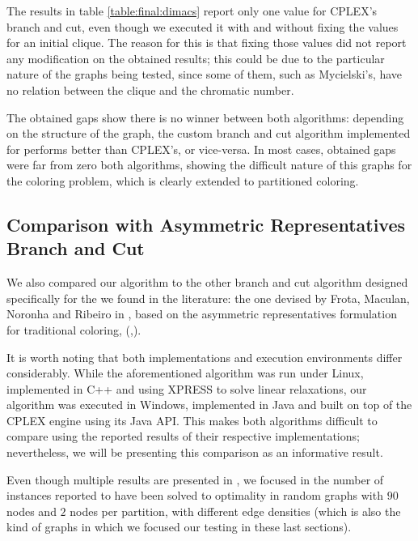 The results in table \ref{table:final:dimacs} report only one value for \textsc{CPLEX}'s branch and cut, even though we executed it with and without fixing the values for an initial clique. The reason for this is that fixing those values did not report any modification on the obtained results; this could be due to the particular nature of the graphs being tested, since some of them, such as Mycielski's, have no relation between the clique and the chromatic number.

The obtained gaps show there is no winner between both algorithms: depending on the structure of the graph, the custom branch and cut algorithm implemented for \PCP{} performs better than \textsc{CPLEX}'s, or vice-versa. In most cases, obtained gaps were far from zero both algorithms, showing the difficult nature of this graphs for the coloring problem, which is clearly extended to partitioned coloring.
 
\subsection{Comparison with Asymmetric Representatives Branch and Cut}

We also compared our algorithm to the other branch and cut algorithm designed specifically for the \PCP{} we found in the literature: the one devised by Frota, Maculan, Noronha and Ribeiro in \cite{frota2010branch}, based on the asymmetric representatives formulation for traditional coloring, (\cite{campelo2004cliques},\cite{campelo2008asymmetric}).

It is worth noting that both implementations and execution environments differ considerably. While the aforementioned algorithm was run under Linux, implemented in C++ and  using \textsc{XPRESS} to solve linear relaxations, our algorithm was executed in Windows, implemented in Java and built on top of the \textsc{CPLEX} engine using its Java API. This makes both algorithms difficult to compare using the reported results of their respective implementations; nevertheless, we will be presenting this comparison as an informative result.

Even though multiple results are presented in \cite{frota2010branch}, we focused in the number of instances reported to have been solved to optimality in random graphs with $90$ nodes and $2$ nodes per partition, with different edge densities (which is also the kind of graphs in which we focused our testing in these last sections). 


